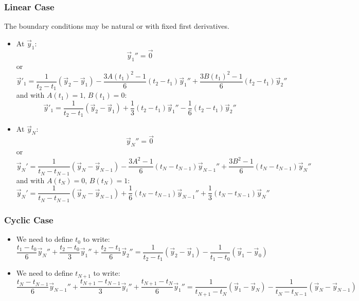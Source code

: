 \documentclass[aps,12pt]{revtex4}
\begin{document}
\subsubsection{Linear Case}
The boundary conditions may be natural or with fixed first derivatives.
\begin{itemize}
\item At $\vec{y}_1$:
\begin{equation}
	\vec{y}_1'' = \vec{0} 
\end{equation}
or
\begin{equation}
\vec{y}'_1 = \dfrac{1}{t_{2}-t_1} \left(\vec{y}_{2}-\vec{y}_1\right) 
	- \dfrac{3A(t_1)^2-1}{6} (t_{2}-t_1) \vec{y}_1''
	+ \dfrac{3B(t_1)^2-1}{6} (t_{2}-t_1) \vec{y}_{2}''
\end{equation}
and with $A(t_1)=1,\,B(t_1)=0$:
\begin{equation}
\vec{y}'_1  = \dfrac{1}{t_{2}-t_1} \left(\vec{y}_{2}-\vec{y}_1\right) 
	+ \dfrac{1}{3} (t_{2}-t_1) \vec{y}_1''
	- \dfrac{1}{6} (t_{2}-t_1) \vec{y}_{2}''
\end{equation}
 
\item At $\vec{y}_N$:
\begin{equation}
	\vec{y}_N'' = \vec{0} 
\end{equation}
or
\begin{equation}
\vec{y}_N' = \dfrac{1}{t_{N}-t_{N-1}} \left(\vec{y}_{N}-\vec{y}_{N-1}\right) 
	- \dfrac{3A^2-1}{6} (t_{N}-t_{N-1}) \vec{y}_{N-1}''
	+ \dfrac{3B^2-1}{6} (t_{N}-t_{N-1}) \vec{y}_{N}''
\end{equation}
and with $A(t_N)=0,\,B(t_N)=1$:
\begin{equation}
	\vec{y}_N' =  \dfrac{1}{t_{N}-t_{N-1}} \left(\vec{y}_{N}-\vec{y}_{N-1}\right) 
	+ \dfrac{1}{6} (t_{N}-t_{N-1}) \vec{y}_{N-1}''
	+ \dfrac{1}{3} (t_{N}-t_{N-1}) \vec{y}_{N}''
\end{equation}
\end{itemize}

\subsubsection{Cyclic Case}
\begin{itemize}
\item We need to define $t_{0}$ to write:
\begin{equation}
 	\dfrac{t_{1}-t_{0}}{6} \vec{y}_{N}'' + 
	\dfrac{t_{2}-t_{0}}{3} \vec{y}_1''
	+\dfrac{t_{2}-t_{1}}{6} \vec{y}_{2}''  = 
	\dfrac{1}{t_{2}-t_1}   \left( \vec{y}_{2} - \vec{y}_{1} \right) -
	\dfrac{1}{t_{1}-t_{0}}  \left( \vec{y}_1 - \vec{y}_{0} \right) 
\end{equation}

\item We need to define $t_{N+1}$ to write:
\begin{equation}
 	\dfrac{t_{N}-t_{N-1}}{6} \vec{y}_{N-1}'' + 
	\dfrac{t_{N+1}-t_{N-1}}{3} \vec{y}_i''
	+\dfrac{t_{N+1}-t_{N}}{6} \vec{y}_{1}''  = 
	\dfrac{1}{t_{N+1}-t_N}   \left( \vec{y}_{1} - \vec{y}_{N} \right) -
	\dfrac{1}{t_{N}-t_{N-1}} \left( \vec{y}_N - \vec{y}_{N-1} \right) 
\end{equation}

\end{itemize}
\end{document}
